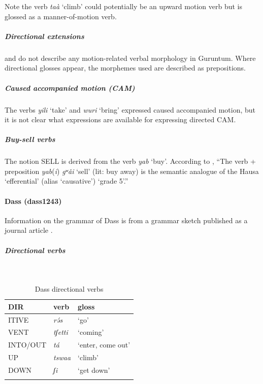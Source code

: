Note the verb \textit{taà} `climb' could potentially be an upward motion verb but is glossed as a manner-of-motion verb.

\subparagraph{Directional extensions}



\citet{harunaGrammaticalOutlineGurdung2003} and \citet{jaggarGuruntumGurdungWest1988} do not describe any motion-related verbal morphology in Guruntum. Where directional glosses appear, the morphemes used are described as prepositions. 

\subparagraph{Caused accompanied motion (CAM)}



The verbs \textit{yili} `take' and \textit{wuri} `bring' expressed caused accompanied motion, but it is not clear what expressions are available for expressing directed CAM. 

\subparagraph{Buy-sell verbs}



The notion SELL is derived from the verb \textit{yab} `buy'. According to \citet[173]{jaggarGuruntumGurdungWest1988}, ``The verb + preposition \textit{yab}(\textit{i}) \textit{gʷǎi} ‘sell’ (lit: buy away) is the semantic analogue of the Hausa ‘efferential’ (alias ‘causative’) ‘grade 5’.''

\newpage
\paragraph*{Dass (dass1243)} \label{dass}

Information on the grammar of Dass is from a grammar sketch published as a journal article \citep{caronDottAkaZodi2002}. 

\subparagraph{Directional verbs}~



\begin{table}[H]
	\caption{Dass directional verbs} 
	\label{tab:dassV}
	\begin{tabular}{lll} %
		\lsptoprule
		DIR & verb & gloss   \\ %
		\midrule
		ITIVE & \textit{rə́s} & `go' \\
		VENT & \textit{tʃetti} & `coming' \\
		INTO/OUT & \textit{tá} & `enter, come out' \\
		UP & \textit{tswaa} & `climb' \\
		DOWN & \textit{ʃi} & `get down' \\
		\lspbottomrule
	\end{tabular}
\end{table}

